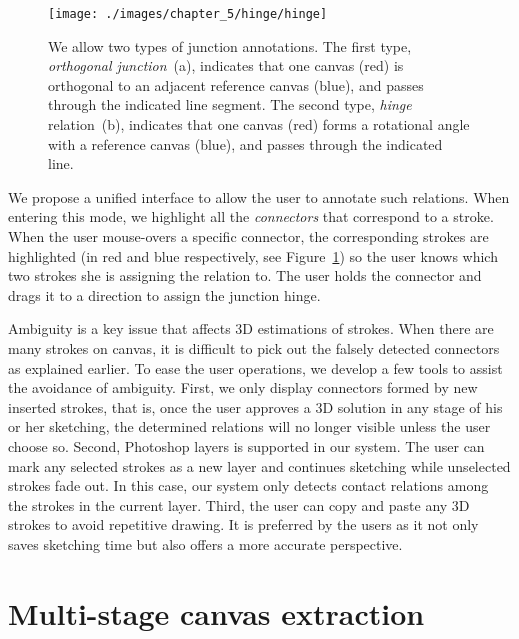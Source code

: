 \begin{figure}[b!]
  \texttt{[image: ./images/chapter\_5/hinge/hinge]}
  \caption[Junction annotations.]{We allow two types of junction annotations. The first type, {\em orthogonal junction}~(a), indicates that one canvas (red) is orthogonal to an adjacent reference canvas (blue), and passes through the indicated line segment. The second type, {\em hinge} relation~(b), indicates that one canvas (red) forms a rotational angle with a reference canvas (blue), and passes through the indicated line.%
  }
  \label{fig:junction_types}
\end{figure}


We propose a unified interface to allow the user to annotate such relations. When entering this mode, we highlight all the \emph{connectors} that correspond to a stroke. When the user mouse-overs a specific connector, the corresponding strokes are highlighted (in red and blue respectively, see Figure~\ref{fig:junction_types}) so the user knows which two strokes she is assigning the relation to. The user holds the connector and drags it to a direction to assign the junction hinge.

Ambiguity is a key issue that affects 3D estimations of strokes. When there are many strokes on canvas, it is difficult to pick out the falsely detected connectors as explained earlier. To ease the user operations, we develop a few tools to assist the avoidance of ambiguity. First, we only display connectors formed by new inserted strokes, that is, once the user approves a 3D solution in any stage of his or her sketching, the determined relations will no longer visible unless the user choose so. Second, Photoshop layers is supported in our system. The user can mark any selected strokes as a new layer and continues sketching while unselected strokes fade out. In this case, our system only detects contact relations among the strokes in the current layer. Third, the user can copy and paste any 3D strokes to avoid repetitive drawing. It is preferred by the users as it not only saves sketching time but also offers a more accurate perspective.


\section{Multi-stage canvas extraction}
\label{algorithm}


